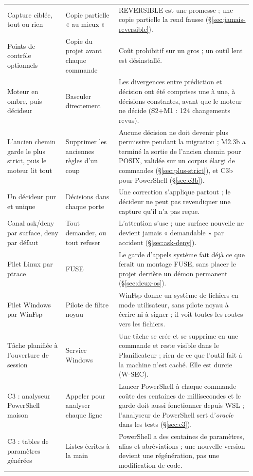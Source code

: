 {\begin{longtable}{@{}L{3.6cm}L{3.6cm}L{7.2cm}@{}}
Capture ciblée, tout ou rien & Copie partielle « au mieux » &
  REVERSIBLE est une promesse ; une copie partielle la rend fausse (§\ref{sec:jamais-reversible}). \\
Points de contrôle optionnels & Copie du projet avant chaque commande &
  Coût prohibitif sur un gros  ; un outil lent est désinstallé. \\
Moteur en ombre, puis décideur & Basculer directement &
  Les divergences entre prédiction et décision ont été comprises une à une, à décisions
  constantes, avant que le moteur ne décide (S2+M1 : 124 changements revus). \\
L'ancien chemin garde le plus strict, puis le moteur lit tout & Supprimer les anciennes règles d'un coup &
  Aucune décision ne doit devenir plus permissive pendant la migration ; M2.3b a terminé la sortie de l'ancien chemin pour POSIX, validée sur un corpus élargi de \nbcorpuslarge{} commandes (§\ref{sec:plus-strict}), et C3b pour PowerShell (§\ref{sec:c3b}). \\
Un décideur pur et unique & Décisions dans chaque porte &
  Une correction s'applique partout ; le décideur ne peut pas revendiquer une capture qu'il
  n'a pas reçue. \\
Canal ask/deny par surface, deny par défaut & Tout demander, ou tout refuser &
  L'attention s'use ; une surface nouvelle ne devient jamais « demandable » par accident
  (§\ref{sec:ask-deny}). \\
Filet Linux par ptrace & FUSE &
  Le garde d'appels système fait déjà ce que ferait un montage FUSE, sans placer le projet
  derrière un démon permanent (§\ref{sec:deux-os}). \\
Filet Windows par WinFsp & Pilote de filtre noyau &
  WinFsp donne un système de fichiers en mode utilisateur, sans pilote noyau à écrire ni à
  signer ; il voit toutes les routes vers les fichiers. \\
Tâche planifiée à l'ouverture de session & Service Windows &
  Une tâche se crée et se supprime en une commande et reste visible dans le Planificateur ;
  rien de ce que l'outil fait à la machine n'est caché. Elle est durcie (W-SEC). \\
C3 : analyseur PowerShell maison & Appeler  pour analyser chaque ligne &
  Lancer PowerShell à chaque commande coûte des centaines de millisecondes et le garde doit
  aussi fonctionner depuis WSL ; l'analyseur de PowerShell sert d'\emph{oracle} dans les
  tests (§\ref{sec:c3}). \\
C3 : tables de paramètres générées & Listes écrites à la main &
  PowerShell a des centaines de paramètres, alias et abréviations ; une nouvelle version
  devient une régénération, pas une modification de code. \\
\end{longtable}
}

